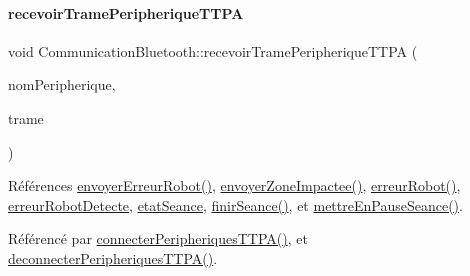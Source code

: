 \paragraph{\texorpdfstring{recevoir\+Trame\+Peripherique\+T\+T\+PA}{recevoirTramePeripheriqueTTPA}}
{\footnotesize\ttfamily void Communication\+Bluetooth\+::recevoir\+Trame\+Peripherique\+T\+T\+PA (\begin{DoxyParamCaption}\item[{Q\+String}]{nom\+Peripherique,  }\item[{Q\+String}]{trame }\end{DoxyParamCaption})\hspace{0.3cm}{\ttfamily [slot]}}



Références \hyperlink{class_communication_bluetooth_a891295407273a810ef9300e743bc34f9}{envoyer\+Erreur\+Robot()}, \hyperlink{class_communication_bluetooth_a5906cd18db7ce9467452acf0ed845f23}{envoyer\+Zone\+Impactee()}, \hyperlink{class_communication_bluetooth_a74bc2dc753fa3490a2847f3c9497e147}{erreur\+Robot()}, \hyperlink{class_communication_bluetooth_a0ceb51c44da6c7479b46ae8e737e1541}{erreur\+Robot\+Detecte}, \hyperlink{class_communication_bluetooth_adc66f3034d46f3964a26b62ad98e784f}{etat\+Seance}, \hyperlink{class_communication_bluetooth_ab2170ef9c868ac2a26b76675c71f770e}{finir\+Seance()}, et \hyperlink{class_communication_bluetooth_a8572b6316814e3d226ce7acc754f0c4d}{mettre\+En\+Pause\+Seance()}.



Référencé par \hyperlink{class_communication_bluetooth_a321073d9dc26aad4b34ecf41a1dee8a4}{connecter\+Peripheriques\+T\+T\+P\+A()}, et \hyperlink{class_communication_bluetooth_aacfffa47d72f3ab5ab554001d5f38fd1}{deconnecter\+Peripheriques\+T\+T\+P\+A()}.


